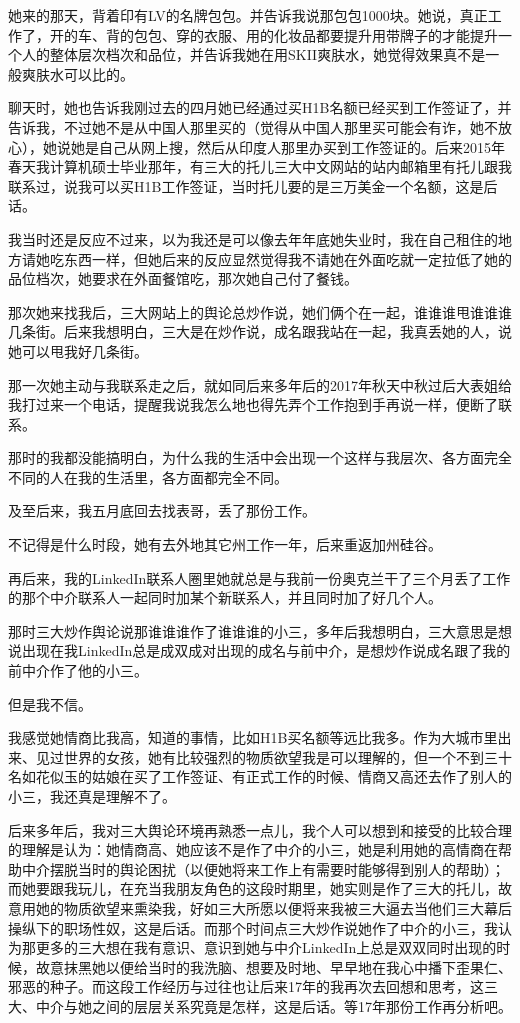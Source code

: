 \documentclass[9pt, b5paper]{article}
\begin{document}
她来的那天，背着印有LV的名牌包包。并告诉我说那包包1000块。她说，真正工作了，开的车、背的包包、穿的衣服、用的化妆品都要提升用带牌子的才能提升一个人的整体层次档次和品位，并告诉我她在用SKII爽肤水，她觉得效果真不是一般爽肤水可以比的。

聊天时，她也告诉我刚过去的四月她已经通过买H1B名额已经买到工作签证了，并告诉我，不过她不是从中国人那里买的（觉得从中国人那里买可能会有诈，她不放心），她说她是自己从网上搜，然后从印度人那里办买到工作签证的。后来2015年春天我计算机硕士毕业那年，有三大的托儿三大中文网站的站内邮箱里有托儿跟我联系过，说我可以买H1B工作签证，当时托儿要的是三万美金一个名额，这是后话。 

我当时还是反应不过来，以为我还是可以像去年年底她失业时，我在自己租住的地方请她吃东西一样，但她后来的反应显然觉得我不请她在外面吃就一定拉低了她的品位档次，她要求在外面餐馆吃，那次她自己付了餐钱。 

那次她来找我后，三大网站上的舆论总炒作说，她们俩个在一起，谁谁谁甩谁谁谁几条街。后来我想明白，三大是在炒作说，成名跟我站在一起，我真丢她的人，说她可以甩我好几条街。

那一次她主动与我联系走之后，就如同后来多年后的2017年秋天中秋过后大表姐给我打过来一个电话，提醒我说我怎么地也得先弄个工作抱到手再说一样，便断了联系。

那时的我都没能搞明白，为什么我的生活中会出现一个这样与我层次、各方面完全不同的人在我的生活里，各方面都完全不同。 

及至后来，我五月底回去找表哥，丢了那份工作。

不记得是什么时段，她有去外地其它州工作一年，后来重返加州硅谷。 

再后来，我的LinkedIn联系人圈里她就总是与我前一份奥克兰干了三个月丢了工作的那个中介联系人一起同时加某个新联系人，并且同时加了好几个人。

那时三大炒作舆论说那谁谁谁作了谁谁谁的小三，多年后我想明白，三大意思是想说出现在我LinkedIn总是成双成对出现的成名与前中介，是想炒作说成名跟了我的前中介作了他的小三。 

但是我不信。

我感觉她情商比我高，知道的事情，比如H1B买名额等远比我多。作为大城市里出来、见过世界的女孩，她有比较强烈的物质欲望我是可以理解的，但一个不到三十名如花似玉的姑娘在买了工作签证、有正式工作的时候、情商又高还去作了别人的小三，我还真是理解不了。

后来多年后，我对三大舆论环境再熟悉一点儿，我个人可以想到和接受的比较合理的理解是认为：她情商高、她应该不是作了中介的小三，她是利用她的高情商在帮助中介摆脱当时的舆论困扰（以便她将来工作上有需要时能够得到别人的帮助）；而她要跟我玩儿，在充当我朋友角色的这段时期里，她实则是作了三大的托儿，故意用她的物质欲望来熏染我，好如三大所愿以便将来我被三大逼去当他们三大幕后操纵下的职场性奴，这是后话。而那个时间点三大炒作说她作了中介的小三，我认为那更多的三大想在我有意识、意识到她与中介LinkedIn上总是双双同时出现的时候，故意抹黑她以便给当时的我洗脑、想要及时地、早早地在我心中播下歪果仁、邪恶的种子。而这段工作经历与过往也让后来17年的我再次去回想和思考，这三大、中介与她之间的层层关系究竟是怎样，这是后话。等17年那份工作再分析吧。 
\end{document}
